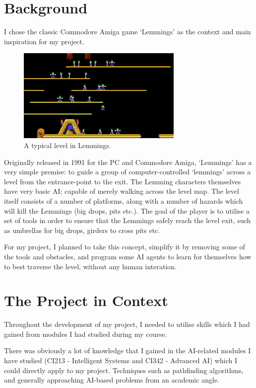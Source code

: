 \documentclass[a4paper,oneside]{report}
\begin{document}
\section{Background}

I chose the classic Commodore Amiga game `Lemmings' as the context and main inspiration for my project.

\begin{figure}[h!]
  \centering
    \includegraphics[width=80mm]{sources/images/lemmings3}
    \caption{A typical level in Lemmings.\label{screen}}
\end{figure}

Originally released in 1991 for the PC and Commodore Amiga, `Lemmings' has a very simple premise: to guide a group of computer-controlled `lemmings’ across a level from the entrance-point to the exit. The Lemming characters themselves have very basic AI; capable of merely walking across the level map. The level itself consists of a number of platforms, along with a number of hazards which will kill the Lemmings (big drops, pits etc.). The goal of the player is to utilise a set of tools in order to ensure that the Lemmings safely reach the level exit, such as umbrellas for big drops, girders to cross pits etc. 

For my project, I planned to take this concept, simplify it by removing some of the tools and obstacles, and program some AI agents to learn for themselves how to best traverse the level, without any human interation.
		
\section{The Project in Context}
	
Throughout the development of my project, I needed to utilise skills which I had gained from modules I had studied during my course.

There was obviously a lot of knowledge that I gained in the AI-related modules I have studied (CI213 - Intelligent Systems and CI342 - Advanced AI) which I could directly apply to my project. Techniques such as pathfinding algorithms, and generally approaching AI-based problems from an academic angle.
\end{document}
